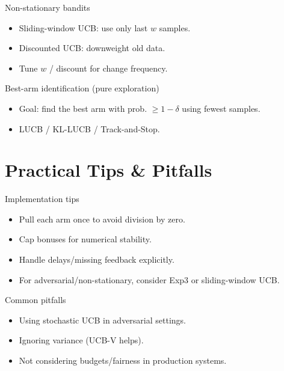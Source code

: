 \documentclass[aspectratio=169]{beamer}
\begin{document}
\begin{frame}{Non-stationary bandits}
\small
\begin{itemize}
  \item Sliding-window UCB: use only last $w$ samples.
  \item Discounted UCB: downweight old data.
  \item Tune $w$ / discount for change frequency.
\end{itemize}
\end{frame}

\begin{frame}{Best-arm identification (pure exploration)}
\small
\begin{itemize}
  \item Goal: find the best arm with prob. $\ge 1-\delta$ using fewest samples.
  \item LUCB / KL-LUCB / Track-and-Stop.
\end{itemize}
\end{frame}

\section{Practical Tips \& Pitfalls}

\begin{frame}{Implementation tips}
\small
\begin{itemize}
  \item Pull each arm once to avoid division by zero.
  \item Cap bonuses for numerical stability.
  \item Handle delays/missing feedback explicitly.
  \item For adversarial/non-stationary, consider Exp3 or sliding-window UCB.
\end{itemize}
\end{frame}

\begin{frame}{Common pitfalls}
\small
\begin{itemize}
  \item Using stochastic UCB in adversarial settings.
  \item Ignoring variance (UCB-V helps).
  \item Not considering budgets/fairness in production systems.
\end{itemize}
\end{frame}
\end{document}
